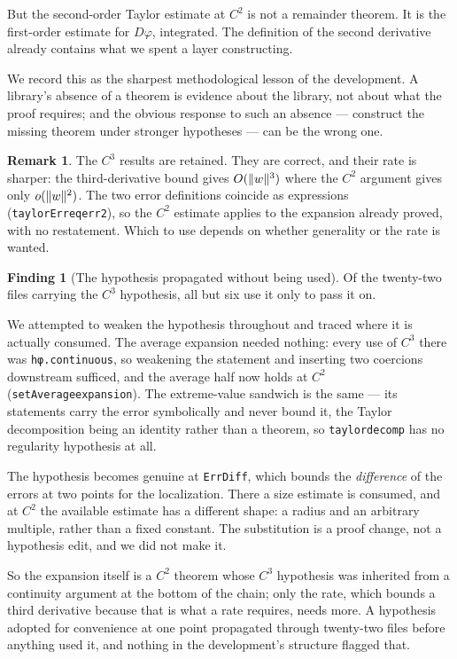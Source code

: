 \documentclass[11pt,reqno]{amsart}
\newcommand{\LEANREF}[1]{\texttt{\small\def\_{\textunderscore\allowbreak}#1}}
\DeclarePairedDelimiter{\norm}{\lVert}{\rVert}
\theoremstyle{plain}
\theoremstyle{definition}
\newtheorem{remark}[theorem]{Remark}
\newtheorem{finding}[theorem]{Finding}
\begin{document}
But the second-order Taylor estimate at $C^2$ is not a remainder theorem. It is
the first-order estimate for $D\varphi$, integrated. The definition of the
second derivative already contains what we spent a layer constructing.

We record this as the sharpest methodological lesson of the development. A
library's absence of a theorem is evidence about the library, not about what
the proof requires; and the obvious response to such an absence --- construct
the missing theorem under stronger hypotheses --- can be the wrong one.

\begin{remark}
The $C^3$ results are retained. They are correct, and their rate is sharper:
the third-derivative bound gives $O(\norm{w}^3)$ where the $C^2$ argument gives
only $o(\norm{w}^2)$. The two error definitions coincide as expressions
(\LEANREF{taylorErr\_eq\_err2}), so the $C^2$ estimate applies to the
expansion already proved, with no restatement. Which to use depends on whether
generality or the rate is wanted.
\end{remark}

\begin{finding}[The hypothesis propagated without being
used]\label{find:propagate}
Of the twenty-two files carrying the $C^3$ hypothesis, all but six use it only
to pass it on.
\end{finding}

We attempted to weaken the hypothesis throughout and traced where it is
actually consumed. The average expansion needed nothing: every use of $C^3$
there was \LEANREF{hφ.continuous}, so weakening the statement and inserting
two coercions downstream sufficed, and the average half now holds at $C^2$
(\LEANREF{setAverage\_expansion}). The extreme-value sandwich is the same ---
its statements carry the error symbolically and never bound it, the Taylor
decomposition being an identity rather than a theorem, so
\LEANREF{taylor\_decomp} has no regularity hypothesis at all.

The hypothesis becomes genuine at \LEANREF{ErrDiff}, which bounds the
\emph{difference} of the errors at two points for the localization. There a
size estimate is consumed, and at $C^2$ the available estimate has a different
shape: a radius and an arbitrary multiple, rather than a fixed constant. The
substitution is a proof change, not a hypothesis edit, and we did not make it.

So the expansion itself is a $C^2$ theorem whose $C^3$ hypothesis was inherited
from a continuity argument at the bottom of the chain; only the rate, which
bounds a third derivative because that is what a rate requires, needs more. A
hypothesis adopted for convenience at one point propagated through twenty-two
files before anything used it, and nothing in the development's structure
flagged that.
\end{document}
